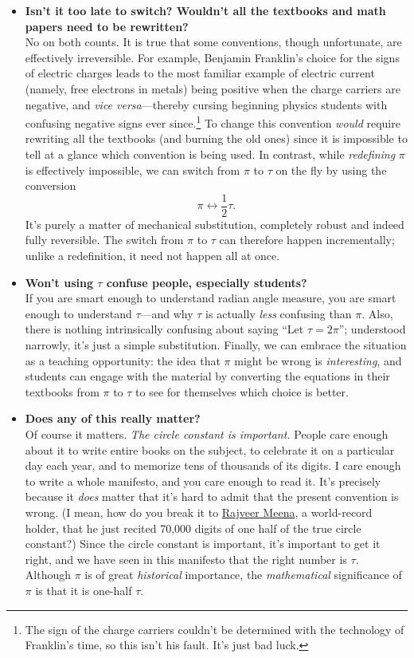 \begin{itemize}
  \item \textbf{Isn't it too late to switch? Wouldn't all the textbooks and math papers need to be rewritten?} \\ No on both counts. It is true that some conventions, though unfortunate, are effectively irreversible. For example, Benjamin Franklin's choice for the signs of electric charges leads to the most familiar example of electric current (namely, free electrons in metals) being positive when the charge carriers are negative, and \emph{vice versa}---thereby cursing beginning physics students with confusing negative signs ever since.\footnote{The sign of the charge carriers couldn't be determined with the technology of Franklin's time, so this isn't his fault. It's just bad luck.} To change this convention \emph{would} require rewriting all the textbooks (and burning the old ones) since it is impossible to tell at a glance which convention is being used. In contrast, while \emph{redefining} $\pi$ is effectively impossible, we can switch from $\pi$ to $\tau$ on the fly by using the conversion \[ \pi \leftrightarrow \textstyle{\frac{1}{2}}\tau. \] It's purely a matter of mechanical substitution, completely robust and indeed fully reversible. The switch from $\pi$ to $\tau$ can therefore happen incrementally; unlike a redefinition, it need not happen all at once.

  \item \textbf{Won't using $\tau$ confuse people, especially students?} \\  If you are smart enough to understand radian angle measure, you are smart enough to understand $\tau$---and  why $\tau$ is actually \emph{less} confusing than $\pi$. Also, there is nothing intrinsically confusing about saying ``Let $\tau = 2\pi$''; understood narrowly, it's just a simple substitution. Finally, we can embrace the situation as a teaching opportunity: the idea that $\pi$ might be wrong is \emph{interesting}, and students can engage with the material by converting the equations in their textbooks from $\pi$ to $\tau$ to see for themselves which choice is better.

  \item \textbf{Does any of this really matter?} \\ Of course it matters. \emph{The circle constant is important.} People care enough about it to write entire books on the subject, to celebrate it on a particular day each year, and to memorize tens of thousands of its digits. I care enough to write a whole manifesto, and you care enough to read it. It's precisely because it \emph{does} matter that it's hard to admit that the present convention is wrong. (I mean, how do you break it to \href{https://www.guinnessworldrecords.com/world-records/most-pi-places-memorised}{Rajveer Meena}, a world-record holder, that he just recited 70,000 digits of one half of the true circle constant?) Since the circle constant is important, it's important to get it right, and we have seen in this manifesto that the right number is $\tau$. Although $\pi$ is of great \emph{historical} importance, the \emph{mathematical} significance of $\pi$ is that it is one-half $\tau$.


\end{itemize}
